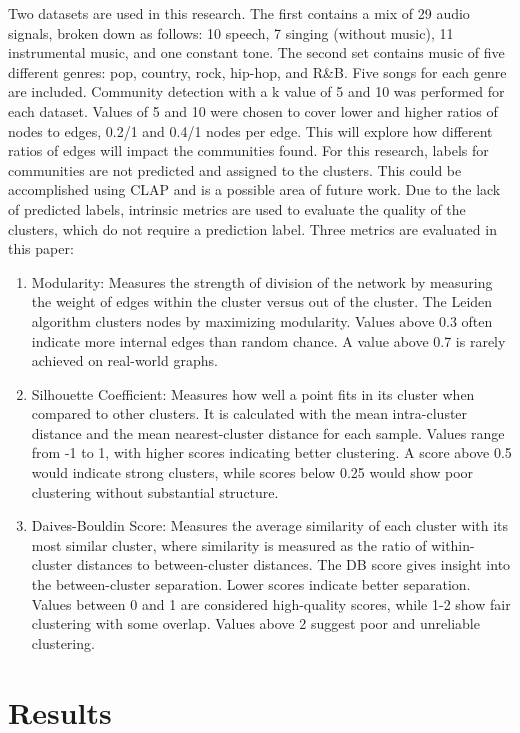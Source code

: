 \documentclass{article}
\begin{document}
Two datasets are used in this research. The first contains a mix of 29 audio signals, broken down as follows: 10 speech, 7 singing (without music), 11 instrumental music, and one constant tone. The second set contains music of five different genres: pop, country, rock, hip-hop, and R\&B. Five songs for each genre are included. Community detection with a k value of 5 and 10 was performed for each dataset. Values of 5 and 10 were chosen to cover lower and higher ratios of nodes to edges, 0.2/1 and 0.4/1 nodes per edge. This will explore how different ratios of edges will impact the communities found. For this research, labels for communities are not predicted and assigned to the clusters. This could be accomplished using CLAP and is a possible area of future work. Due to the lack of predicted labels, intrinsic metrics are used to evaluate the quality of the clusters, which do not require a prediction label. Three metrics are evaluated in this paper:

\begin{enumerate}[noitemsep]
  \item Modularity: Measures the strength of division of the network by measuring the weight of edges within the cluster versus out of the cluster. The Leiden algorithm clusters nodes by maximizing modularity. Values above 0.3 often indicate more internal edges than random chance. A value above 0.7 is rarely achieved on real-world graphs.
  \item Silhouette Coefficient\cite{rousseeuw}: Measures how well a point fits in its cluster when compared to other clusters. It is calculated with the mean intra-cluster distance and the mean nearest-cluster distance for each sample. Values range from -1 to 1, with higher scores indicating better clustering. A score above 0.5 would indicate strong clusters, while scores below 0.25 would show poor clustering without substantial structure.
  \item Daives-Bouldin Score\cite{davies}: Measures the average similarity of each cluster with its most similar cluster, where similarity is measured as the ratio of within-cluster distances to between-cluster distances. The DB score gives insight into the between-cluster separation. Lower scores indicate better separation. Values between 0 and 1 are considered high-quality scores, while 1-2 show fair clustering with some overlap. Values above 2 suggest poor and unreliable clustering.
\end{enumerate}

\section{Results}
\end{document}
